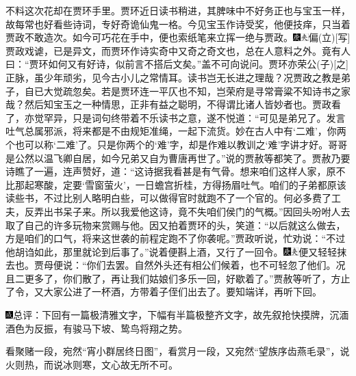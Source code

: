 不料这次花却在贾环手里。贾环近日读书稍进，其脾味中不好务正也与宝玉一样，故每常也好看些诗词，专好奇诡仙鬼一格。今见宝玉作诗受奖，他便技痒，只当着贾政不敢造次。如今可巧花在手中，便也索纸笔来立挥一绝与贾政。{\includegraphics[width=3mm]{../Images/00004}\includegraphics[width=3mm]{../Images/00012}\footnotesize \kaishu 偏{(立)}{[}写{]}贾政戏谑，已是异文，而贾环作诗实奇中又奇之奇文也，总在人意料之外。竟有人曰：“贾环如何又有好诗，似前言不搭后文矣。”盖不可向说问。贾环亦荣公{(子)}{[}之{]}正脉，虽少年顽劣，见今古小儿之常情耳。读书岂无长进之理哉？况贾政之教是弟子，自已大觉疏忽矣。若是贾环连一平仄也不知，岂荣府是寻常膏粱不知诗书之家哉？然后知宝玉之一种情思，正非有益之聪明，不得谓比诸人皆妙者也。}贾政看了，亦觉罕异，只是词句终带着不乐读书之意，遂不悦道：“可见是弟兄了。发言吐气总属邪派，将来都是不由规矩准绳，一起下流货。妙在古人中有‘二难’，你两个也可以称‘二难’了。只是你两个的‘难’字，却是作难以教训之‘难’字讲才好。哥哥是公然以温飞卿自居，如今兄弟又自为曹唐再世了。”说的贾赦等都笑了。贾赦乃要诗瞧了一遍，连声赞好，道：“这诗据我看甚是有气骨。想来咱们这样人家，原不比那起寒酸，定要‘雪窗萤火’，一日蟾宫折桂，方得扬眉吐气。咱们的子弟都原该读些书，不过比别人略明白些，可以做得官时就跑不了一个官的。何必多费了工夫，反弄出书呆子来。所以我爱他这诗，竟不失咱们侯门的气概。”因回头吩咐人去取了自己的许多玩物来赏赐与他。因又拍着贾环的头，笑道：“以后就这么做去，方是咱们的口气，将来这世袭的前程定跑不了你袭呢。”贾政听说，忙劝说：“不过他胡诌如此，那里就论到后事了。”说着便斟上酒，又行了一回令。{\includegraphics[width=3mm]{../Images/00004}\includegraphics[width=3mm]{../Images/00012}\footnotesize \kaishu 便又轻轻抹去也。}贾母便说：“你们去罢。自然外头还有相公们候着，也不可轻忽了他们。况且二更多了，你们散了，再让我们姑娘们多乐一回，好歇着了。”贾赦等听了，方止了令，又大家公进了一杯酒，方带着子侄们出去了。要知端详，再听下回。

{\includegraphics[width=3mm]{../Images/00005}\kaishu 总评：下回有一篇极清雅文字，下幅有半篇极整齐文字，故先叙抢快摸牌，沉湎酒色为反振，有骏马下坡、鸷鸟将翔之势。}

{\kaishu 看聚赌一段，宛然“宵小群居终日图”，看赏月一段，又宛然“望族序齿燕毛录”，说火则热，而说冰则寒，文心故无所不可。}